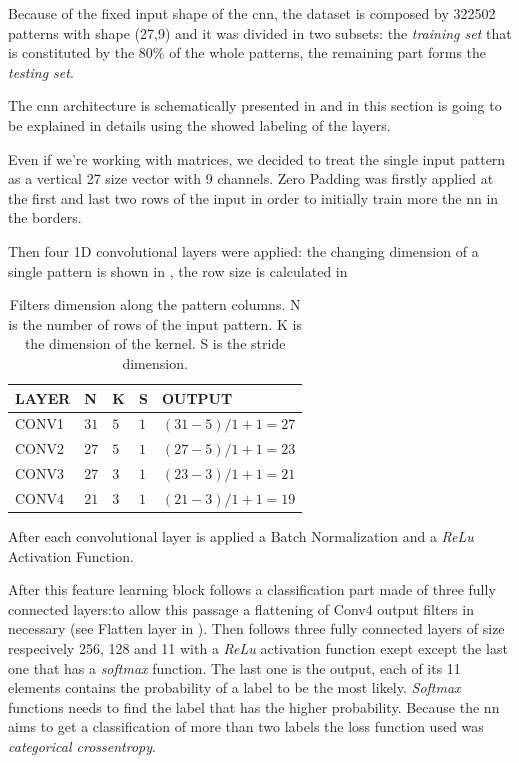 Because of the fixed input shape of the \gls{cnn}, the dataset  is composed by 322502 patterns with shape (27,9) and it was divided in two subsets: the \textit{training set} that is constituted by the 80\% of the whole patterns, the remaining part forms the \textit{testing set}.

The \gls{cnn} architecture is schematically presented in  and in this section is going to be explained in details using the showed labeling of the layers. 

Even if we're working with matrices, we decided to treat the single input pattern as a vertical 27 size vector with 9 channels. Zero Padding was firstly applied at the first and last two rows of the input in order to initially train more the \gls{nn} in the borders.

Then four 1D convolutional layers were applied: the changing dimension of a single pattern is shown in , the row size is calculated in 

\begin{table}[htp]
\small
	\centering
		\renewcommand{\arraystretch}{1}%
	\begin{tabular}{@{}lllll@{}}
	\toprule
	LAYER & N & K & S & OUTPUT\\
	\midrule
	CONV1 & $31$ & $5$ & $1$ & $(31-5)/1+1 = 27$\\
	CONV2 & $27$ & $5$ & $1$ & $(27-5)/1+1 = 23$\\
	CONV3 & $27$ & $3$ & $1$ & $(23-3)/1+1 = 21$\\
	CONV4 & $21$ & $3$ & $1$ & $(21-3)/1+1 = 19$\\
	\bottomrule
	\end{tabular}
	\caption{Filters dimension along the pattern columns. N is the number of rows of the input pattern. K is the dimension of the kernel. S is the stride dimension.}
	\label{tab:filtersize}
\end{table}

After each convolutional layer is applied a Batch Normalization and a \textit{ReLu} Activation Function.

After this feature learning block follows a classification part made of three fully connected layers:to allow this passage a flattening of Conv4 output filters in necessary (see Flatten layer in ). Then follows three fully connected layers of size respecively 256, 128 and 11 with a \textit{ReLu} activation function exept except the last one that has a \textit{softmax} function. The last one is the output, each of its 11 elements contains the probability of a label to be the most likely. \textit{Softmax} functions needs to find the label that has the higher probability. Because the \gls{nn} aims to get a classification of more than two labels the loss function used was \textit{categorical crossentropy}.

